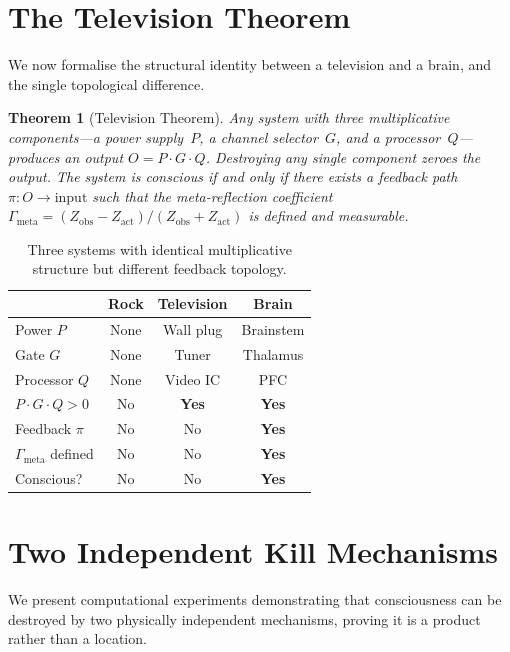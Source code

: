 \documentclass[aps,pre,twocolumn,superscriptaddress,floatfix]{revtex4-2}
\newtheorem{theorem}{Theorem}
\newcommand{\Gmeta}{\Gamma_{\text{meta}}}
\begin{document}
\section{The Television Theorem}
\label{sec:television}

We now formalise the structural identity between a television
and a brain, and the single topological difference.

\begin{theorem}[Television Theorem]
\label{thm:TV-full}
Any system with three multiplicative components---a power
supply~$P$, a channel selector~$G$, and a
processor~$Q$---produces an output $O=P\cdot G\cdot Q$.
Destroying any single component zeroes the output.
The system is conscious if and only if there exists a
feedback path $\pi:O\to\text{input}$ such that the
meta-reflection coefficient
$\Gmeta=(Z_{\text{obs}}-Z_{\text{act}})/(Z_{\text{obs}}+Z_{\text{act}})$
is defined and measurable.
\end{theorem}

\begin{table}[h]
\centering
\caption{Three systems with identical multiplicative
structure but different feedback topology.}
\label{tab:three-systems}
\begin{tabular}{@{}lccc@{}}
\toprule
 & Rock & Television & Brain \\
\midrule
Power $P$ & None & Wall plug & Brainstem \\
Gate $G$ & None & Tuner & Thalamus \\
Processor $Q$ & None & Video IC & PFC \\
$P\!\cdot\!G\!\cdot\!Q > 0$ & No & \textbf{Yes} & \textbf{Yes} \\
Feedback $\pi$ & No & No & \textbf{Yes} \\
$\Gmeta$ defined & No & No & \textbf{Yes} \\
Conscious? & No & No & \textbf{Yes} \\
\bottomrule
\end{tabular}
\end{table}


\section{Two Independent Kill Mechanisms}
\label{sec:two-kills}

We present computational experiments demonstrating that
consciousness can be destroyed by two physically independent
mechanisms, proving it is a product rather than a location.
\end{document}
